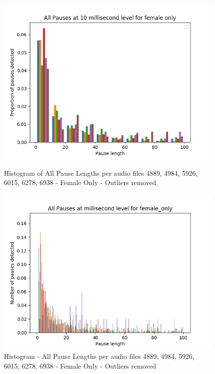 \begin{figure}[h!]
	\begin{center}
		\includegraphics[scale=0.7]{src/main-matter/results/experiment-sex/pause-analysis/pause_histogram_bin10female}
		\caption{Histogram of All Pause Lengths per audio files 4889, 4984, 5926, 6015, 6278, 6938 - Female Only - Outliers removed}
		\label{female-10bins}
	\end{center}
	\begin{center}
		\includegraphics[scale=0.7]{src/main-matter/results/experiment-sex/pause-analysis/pause_histogram_bin100female}
		\caption{Histogram - All Pause Lengths per audio files 4889, 4984, 5926, 6015, 6278, 6938 - Female Only - Outliers removed}
		\label{default}
	\end{center}
\end{figure}








